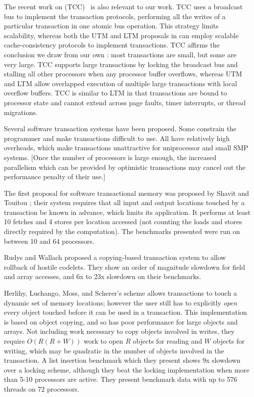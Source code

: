 The recent work on  (TCC)~\cite{HammondWoCh04} is also relevant to our work.
TCC uses a broadcast bus to implement the transaction protocols,
performing all the writes of a particular transaction in one atomic
bus operation.  This strategy limits scalability, whereas both the UTM and
LTM proposals in 
can employ scalable cache-consistency protocols to implement
transactions.  TCC affirms the conclusion we draw from our own
: most transactions are small, but some are very large.  TCC
supports large transactions by locking the broadcast bus and stalling
all other processors when any processor buffer overflows, whereas UTM
and LTM allow overlapped execution of multiple large transactions with
local overflow buffers.  TCC is similar to LTM in that transactions
are bound to processor state and cannot extend across page faults,
timer interrupts, or thread migrations.


Several software transaction systems have been proposed.  Some constrain the
programmer and make transactions difficult to use.  All have
relatively high overheads, which make transactions unattractive for
uniprocessor and small SMP systems. [Once the number of processors is
large enough, the increased parallelism which can be provided by
optimistic transactions may cancel out the performance penalty of
their use.]

The first proposal for software transactional memory was proposed by
Shavit and Touitou \cite{ShavitTo95}; their system requires that all
input and output locations touched by a transaction be known in
advance, which limits its application.  It performs at least 10
fetches and 4 stores per location accessed (not counting the loads and
stores directly required by the computation).  The benchmarks
presented were run on between 10 and 64 processors.

Rudys and Wallach \cite{RudysWa02} proposed a copying-based
transaction system to allow rollback of hostile codelets.
They show an order of magnitude slowdown for field and array
accesses, and 6x to 23x slowdown on their benchmarks.

Herlihy, Luchango, Moss, and Scherer's scheme \cite{HerlihyLuMoSc03}
allows transactions to touch a dynamic set of memory locations;
however the user still has to explicitly \emph{open} every object touched
before it can be used in a transaction.  This implementation is based
on object copying, and so has poor performance for large objects and
arrays.  Not including work necessary to copy objects involved in
writes, they require $O(R(R+W))$ work to open $R$ objects for reading
and $W$ objects for writing, which may be quadratic in the number of objects
involved in the transaction.   A list insertion benchmark which they
present shows 9x slowdown over a locking scheme, although they beat the locking
implementation when more than 5-10 processors are active.  They
present benchmark data with up to 576 threads on 72 processors.


